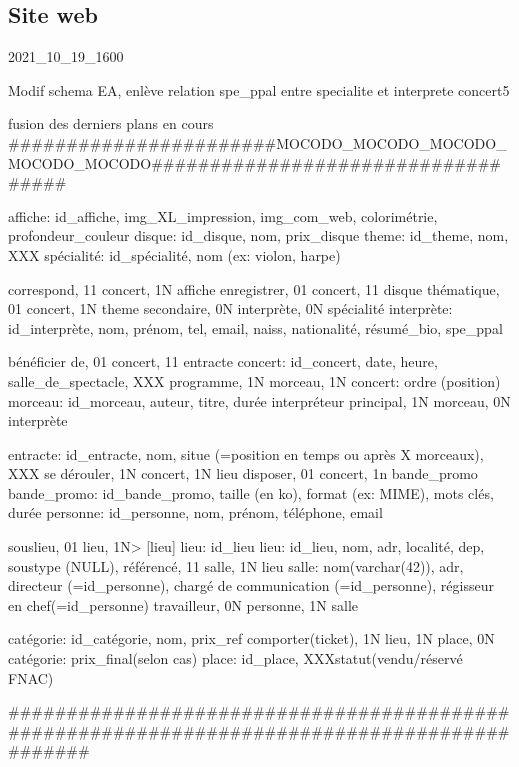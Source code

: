\documentclass[12pt,a4paper]{article}
\begin{document}
{%
\subsection{Site web}





2021_10_19_1600

Modif schema EA, enlève relation spe_ppal entre specialite et interprete
concert5


fusion des derniers plans en cours
#######################MOCODO_MOCODO_MOCODO_MOCODO_MOCODO###################################

affiche: id_affiche, img_XL_impression, img_com_web, colorimétrie, profondeur_couleur
disque: id_disque, nom, prix_disque
theme: id_theme, nom, XXX
spécialité: id_spécialité, nom (ex: violon, harpe)

correspond, 11 concert, 1N affiche
enregistrer, 01 concert, 11 disque
thématique, 01 concert, 1N theme
secondaire, 0N interprète, 0N spécialité
interprète: id_interprète, nom, prénom, tel, email, naiss, nationalité, résumé_bio, spe_ppal

bénéficier de, 01 concert, 11 entracte
concert: id_concert, date, heure, salle_de_spectacle, XXX
programme, 1N morceau, 1N concert: ordre (position)
morceau: id_morceau, auteur, titre, durée
interpréteur principal, 1N morceau, 0N interprète

entracte: id_entracte, nom, situe (=position en temps ou après X morceaux), XXX
se dérouler, 1N concert, 1N lieu
disposer, 01 concert, 1n bande_promo
bande_promo: id_bande_promo, taille (en ko), format (ex: MIME), mots clés, durée
personne: id_personne, nom, prénom, téléphone, email

souslieu, 01 lieu,   1N> [lieu] lieu: id_lieu
lieu: id_lieu, nom, adr, localité, dep, soustype (NULL),
référencé, 11 salle, 1N lieu
salle: nom(varchar(42)), adr, directeur (=id_personne), chargé de communication (=id_personne), régisseur en chef(=id_personne)
travailleur, 0N personne, 1N salle

catégorie: id_catégorie, nom, prix_ref
comporter(ticket), 1N lieu, 1N place, 0N catégorie: prix_final(selon cas)
place: id_place, XXXstatut(vendu/réservé FNAC)


#############################################################################################






























}
\end{document}
